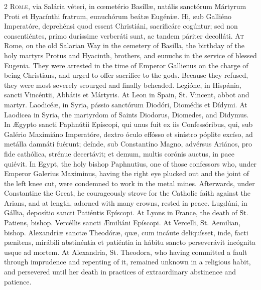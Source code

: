 \begin{paracol}{2}
\lettrine[lines=2]{R}{omæ,} via Salária 
 véteri, in cœmetério Basíllæ, natális sanctórum Mártyrum Proti et Hyacínthi 
 fratrum, eunuchórum beátæ Eugéniæ. Hi, sub Galliéno Imperatóre, 
 deprehénsi quod essent Christiáni, sacrificáre cogúntur; sed non 
 consentiéntes, primo duríssime verberáti sunt, ac tandem páriter decolláti.
\switchcolumn
{}
\lettrine[lines=2]{A}{t} Rome, on the old Salarian Way in 
 the cemetery of Basilla, the birthday of the holy martyrs Protus and 
 Hyacinth, brothers, and eunuchs in the service of blessed Eugenia. 
 They were arrested in the time of Emperor Gallienus on the charge of being 
 Christians, and urged to offer sacrifice to the gods. Because they 
 refused, they were most severely scourged and finally beheaded.
\switchcolumn*
{}
Legióne, in Hispánia, 
 sancti Vincéntii, Abbátis et Mártyris.
\switchcolumn
{}
At Leon in Spain, St. Vincent, abbot 
 and martyr.
\switchcolumn*
{}
Laodicéæ, in Syria, 
 pássio sanctórum Diodóri, Diomédis et Dídymi.
\switchcolumn
{}
At Laodicea in Syria, the martyrdom 
 of Saints Diodorus, Diomedes, and Didymus.
\switchcolumn*
{}
In Ægypto sancti 
 Paphnútii Epíscopi, qui unus fuit ex iis Confessóribus, qui, sub Galério 
 Maximiáno Imperatóre, dextro óculo effósso et sinístro póplite excíso, ad 
 metálla damnáti fuérunt; deínde, sub Constantíno Magno, advérsus Ariános, 
 pro fide cathólica, strénue decertávit; et demum, multis corónis auctus, in 
 pace quiévit.
\switchcolumn
{}
In Egypt, the holy bishop Paphnutius, 
 one of those confessors who, under Emperor Galerius Maximinus, having the 
 right eye plucked out and the joint of the left knee cut, were condemned to 
 work in the metal mines. Afterwards, under Constantine the Great, he 
 courageously strove for the Catholic faith against the Arians, and at 
 length, adorned with many crowns, rested in peace.
\switchcolumn*
{}
Lugdúni, in Gállia, 
 deposítio sancti Patiéntis Epíscopi.
\switchcolumn
{}
At Lyons in France, the death of St. 
 Patiens, bishop.
\switchcolumn*
{}
Vercéllis sancti 
 Æmiliáni Epíscopi.
\switchcolumn
{}
At Vercelli, St. Aemilian, bishop.
\switchcolumn*
{}
Alexandríæ sanctæ 
 Theodóræ, quæ, cum incáute deliquísset, inde, facti pænitens, mirábili 
 abstinéntia et patiéntia in hábitu sancto perseverávit incógnita usque ad 
 mortem.
\switchcolumn
{}
At Alexandria, St. Theodora, who 
 having committed a fault through imprudence and repenting of it, remained 
 unknown in a religious habit, and persevered until her death in practices of 
 extraordinary abstinence and patience.
\switchcolumn*
{}
\end{paracol}


